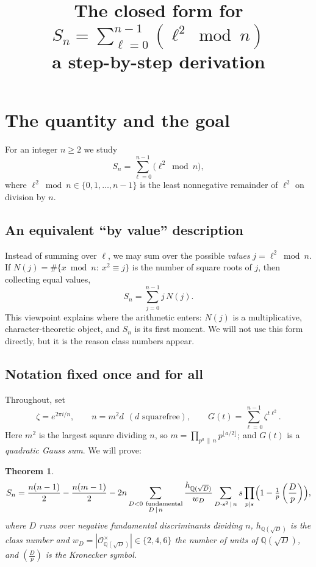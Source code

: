 \documentclass[11pt]{article}
\title{The closed form for $\displaystyle S_n=\sum_{\ell=0}^{n-1}(\ell^2\bmod n)$\\[2pt]
\large a step-by-step derivation}
\author{}
\date{}
\newcommand{\leg}[2]{\left(\frac{#1}{#2}\right)}
\newtheorem{theorem}{Theorem}
\begin{document}
\maketitle

\section{The quantity and the goal}

For an integer $n\ge2$ we study
\[
S_n=\sum_{\ell=0}^{n-1}\bigl(\ell^2\bmod n\bigr),
\]
where $\ell^2\bmod n\in\{0,1,\dots,n-1\}$ is the least nonnegative remainder of $\ell^2$ on division by $n$.

\subsection{An equivalent ``by value'' description}
Instead of summing over $\ell$, we may sum over the possible \emph{values} $j=\ell^2\bmod n$. If
$N(j)=\#\{x\bmod n:\ x^2\equiv j\}$ is the number of square roots of $j$, then collecting equal values,
\[
S_n=\sum_{j=0}^{n-1} j\,N(j).
\]
This viewpoint explains where the arithmetic enters: $N(j)$ is a multiplicative, character-theoretic object,
and $S_n$ is its first moment. We will not use this form directly, but it is the reason class numbers appear.

\subsection{Notation fixed once and for all}
Throughout, set
\[
\zeta=e^{2\pi i/n},\qquad n=m^2 d\ \ (d\text{ squarefree}),\qquad
G(t)=\sum_{\ell=0}^{n-1}\zeta^{t\ell^2}.
\]
Here $m^2$ is the largest square dividing $n$, so $m=\prod_{p^a\,\|\,n}p^{\lfloor a/2\rfloor}$; and $G(t)$ is a
\emph{quadratic Gauss sum}. We will prove:

\begin{theorem}\label{thm:main}
\[
S_n=\frac{n(n-1)}{2}-\frac{n(m-1)}{2}
-2n\sum_{\substack{D<0\ \text{fundamental}\\ D\,\mid\, n}}\frac{h_{\mathbb{Q}(\sqrt D)}}{w_D}
\sum_{D\cdot s^2\,\mid\, n}s\prod_{p\mid s}\Bigl(1-\tfrac1p\leg{D}{p}\Bigr),
\]
where $D$ runs over negative fundamental discriminants dividing $n$, $h_{\mathbb{Q}(\sqrt D)}$ is the class
number and $w_D=|\mathcal{O}_{\mathbb{Q}(\sqrt D)}^\times|\in\{2,4,6\}$ the number of units of $\mathbb{Q}(\sqrt D)$,
and $\leg{D}{p}$ is the Kronecker symbol.
\end{theorem}
\end{document}
